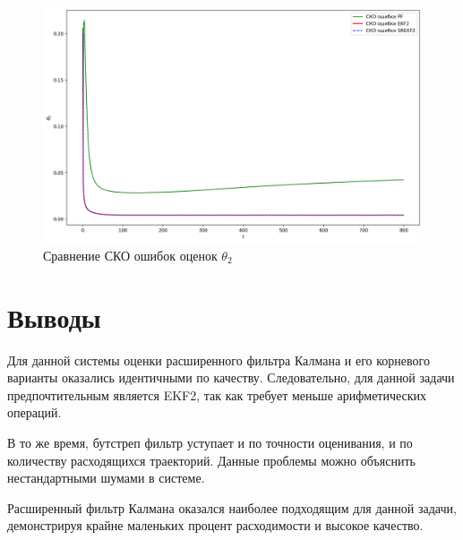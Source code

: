\documentclass[a4paper,12pt]{article}
\begin{document}
\begin{landscape}
\begin{figure}[p]
\end{figure}

\begin{figure}[p]
\centering
\caption{Сравнение СКО ошибок оценок $\theta_2$}
\includegraphics[width=0.95\linewidth]{RMSE_theta2.png}
\end{figure}
\end{landscape}

\section{Выводы}

Для данной системы оценки расширенного фильтра Калмана и его корневого варианты оказались идентичными по качеству. Следовательно, для данной задачи предпочтительным является EKF2, так как требует меньше арифметических операций. 

В то же время, бутстреп фильтр уступает и по точности оценивания, и по количеству расходящихся траекторий. Данные проблемы можно объяснить нестандартными шумами в системе.

Расширенный фильтр Калмана оказался наиболее подходящим для данной задачи, демонстрируя крайне маленьких процент расходимости и высокое качество. 
\end{document}
